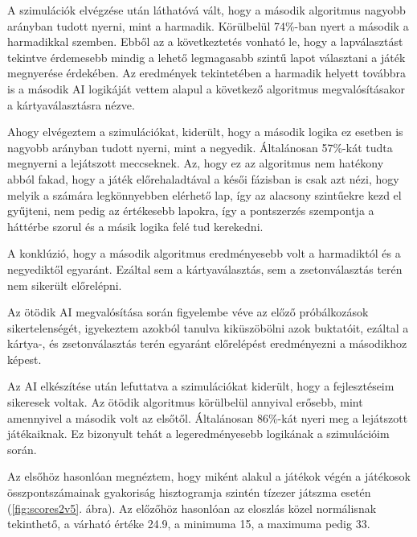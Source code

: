
A szimulációk elvégzése után láthatóvá vált, hogy a második algoritmus nagyobb arányban tudott nyerni, mint a harmadik. Körülbelül 74\%-ban nyert a második a harmadikkal szemben. Ebből az a következtetés vonható le, hogy a lapválasztást tekintve érdemesebb mindig a lehető legmagasabb szintű lapot választani a játék megnyerése érdekében. Az eredmények tekintetében a harmadik helyett továbbra is a második AI logikáját vettem alapul a következő algoritmus megvalósításakor a kártyaválasztásra nézve.


Ahogy elvégeztem a szimulációkat, kiderült, hogy a második logika ez esetben is nagyobb arányban tudott nyerni, mint a negyedik. Általánosan 57\%-kát tudta megnyerni a lejátszott meccseknek. Az, hogy ez az algoritmus nem hatékony abból fakad, hogy a játék előrehaladtával a késői fázisban is csak azt nézi, hogy melyik a számára legkönnyebben elérhető lap, így az alacsony szintűekre kezd el gyűjteni, nem pedig az értékesebb lapokra, így a pontszerzés szempontja a háttérbe szorul és a másik logika felé tud kerekedni.

A konklúzió, hogy a második algoritmus eredményesebb volt a harmadiktól és a negyediktől egyaránt. Ezáltal sem a kártyaválasztás, sem a zsetonválasztás terén nem sikerült előrelépni.


Az ötödik AI megvalósítása során figyelembe véve az előző próbálkozások sikertelenségét, igyekeztem azokból tanulva kiküszöbölni azok buktatóit, ezáltal a kártya-, és zsetonválasztás terén egyaránt előrelépést eredményezni a másodikhoz képest.

Az AI elkészítése után lefuttatva a szimulációkat kiderült, hogy a fejlesztéseim sikeresek voltak.
Az ötödik algoritmus körülbelül annyival erősebb, mint amennyivel a második volt az elsőtől. Általánosan 86\%-kát nyeri meg a lejátszott játékaiknak. Ez bizonyult tehát a legeredményesebb logikának a szimulációim során.

Az elsőhöz hasonlóan megnéztem, hogy miként alakul a játékok végén a játékosok összpontszámainak gyakoriság hisztogramja szintén tízezer játszma esetén (\ref{fig:scores2v5}. ábra). Az előzőhöz hasonlóan az eloszlás közel normálisnak tekinthető, a várható értéke 24.9, a minimuma 15, a maximuma pedig 33.

